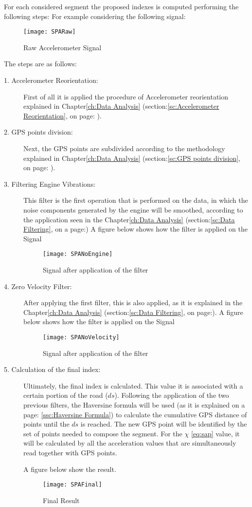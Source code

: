 \documentclass[tesi]{subfiles}
\begin{document}
For each considered segment the proposed indexes is computed performing the following steps:
\clearpage
For example considering the following signal:
\begin{figure}[H]
\centering
\texttt{[image: SPARaw]}
\caption{Raw Accelerometer Signal}
\end{figure}

The steps are as follows:

\begin{description}
\item[1. Accelerometer Reorientation:] First of all it is applied the procedure of Accelerometer reorientation explained in Chapter\ref{ch:Data Analysis} (section:\ref{sc:Accelerometer Reorientation}, on page: \pageref{sc:Accelerometer Reorientation}).
\item[2. GPS points division:] Next, the GPS points are subdivided according to the methodology explained in Chapter\ref{ch:Data Analysis} (section:\ref{sc:GPS points division}, on page: \pageref{sc:GPS points division}).
\item[3. Filtering Engine Vibrations:] This filter is the first operation that is performed on the data, in which the noise components generated by the engine will be smoothed, according to the application seen in the Chapter\ref{ch:Data Analysis} (section:\ref{sc:Data Filtering}, on a page:\pageref{sssc:Remove Engine Vibrations Filter}) A figure below shows how the filter is applied on the Signal
\begin{figure}[H]
\centering
\texttt{[image: SPANoEngine]}
\caption{Signal after application of the filter}
\end{figure}
\item[4. Zero Velocity Filter:] After applying the first filter, this is also applied, as it is explained in the Chapter\ref{ch:Data Analysis} (section:\ref{sc:Data Filtering}, on page:\pageref{sssc:Zero Velocity Filter}). A figure below shows how the filter is applied on the Signal
\begin{figure}[H]
\centering
\texttt{[image: SPANoVelocity]}
\caption{Signal after application of the filter}
\end{figure}

\item[5. Calculation of the final index:] Ultimately, the final index is calculated.
This value it is associated with a certain portion of the road ($ds$). Following the application of the two previous filters, the Haversine formula will be used (as it is explained on a page: \ref{ssc:Haversine Formula}) to calculate the cumulative GPS distance of points until the $ds$ is reached. The new GPS point will be identified by the set of points needed to compose the segment. For the $\chi$ \thinspace \ref{eq:sap} value, it will be calculated by all the acceleration values that are simultaneously read together with GPS points.

A figure below show the result.
\begin{figure}[H]
\centering
\texttt{[image: SPAFinal]}
\caption{Final Result}
\end{figure}\label{fig:Simple Accelerations Points Final Result}
\end{description}
\end{document}

